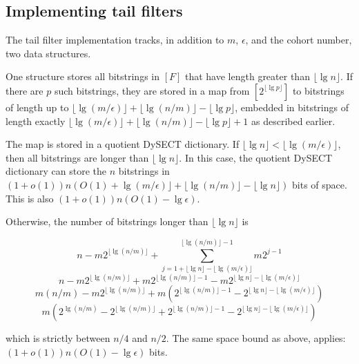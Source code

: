 \documentclass[11pt,letterpaper]{article}
\begin{document}
\subsection{Implementing tail filters}

The tail filter implementation tracks, in addition to $m$, $\epsilon$, and the cohort number, two data structures.


One structure stores all bitstrings in $[F]$ that have length greater than $\lfloor \lg n \rfloor$.
If there are $p$ such bitstrings, they are stored in a map from $[2^{\lfloor \lg p \rfloor}]$ to bitstrings of length up to $\lfloor \lg (m/\epsilon) \rfloor + \lfloor \lg(n/m) \rfloor - \lfloor \lg p \rfloor$, embedded in bitstrings of length exactly ${\lfloor \lg (m/\epsilon) \rfloor + \lfloor \lg(n/m) \rfloor - \lfloor \lg p \rfloor + 1}$ as described earlier.

The map is stored in a quotient DySECT dictionary.
If $\lfloor \lg n \rfloor < \lfloor \lg (m/\epsilon) \rfloor$, then all bitstrings are longer than $\lfloor \lg n \rfloor$.
In this case, the quotient DySECT dictionary can store the $n$ bitstrings in $(1 + o(1)) n (O(1) + \lg (m/\epsilon) \rfloor + \lfloor \lg(n/m) \rfloor - \lfloor \lg n \rfloor)$ bits of space.
This is also $(1 + o(1)) n (O(1) - \lg \epsilon)$.

Otherwise, the number of bitstrings longer than $\lfloor \lg n \rfloor$ is

$$n - m2^{\lfloor \lg (n/m) \rfloor} + \sum_{j=1 + \lfloor \lg n \rfloor - \lfloor \lg (m/\epsilon) \rfloor}^{\lfloor \lg (n/m) \rfloor - 1} m2^{j-1}$$
$$n - m2^{\lfloor \lg (n/m) \rfloor} + m2^{\lfloor \lg (n/m) \rfloor - 1} - m2^{\lfloor \lg n \rfloor - \lfloor \lg (m/\epsilon) \rfloor}$$
$$m(n/m) - m2^{\lfloor \lg (n/m) \rfloor} + m\left(2^{\lfloor \lg (n/m) \rfloor - 1} - 2^{\lfloor \lg n \rfloor - \lfloor \lg (m/\epsilon) \rfloor}\right)$$
$$m\left(2^{\lg(n/m)} - 2^{\lfloor \lg (n/m) \rfloor} + 2^{\lfloor \lg (n/m) \rfloor - 1} - 2^{\lfloor \lg n \rfloor - \lfloor \lg (m/\epsilon) \rfloor}\right)$$

which is strictly between $n/4$ and $n/2$.
The same space bound as above, applies: $(1 + o(1)) n (O(1) - \lg \epsilon)$ bits.
\end{document}
